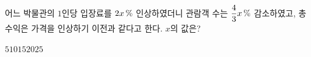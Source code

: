 어느 박물관의 $1$인당 입장료를 $2x\mkern3mu \%$ 인상하였더니 관람객 수는 $\dfrac{4}{3}x\mkern3mu \%$ 감소하였고, 총 수익은 가격을 인상하기 이전과 같다고 한다. $x$의 값은?
\begin{choices32}{$5$}{$10$}{$15$}{$20$}{$25$}\end{choices32}
